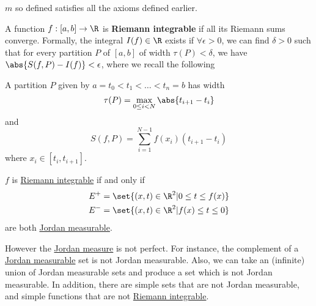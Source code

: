 \documentclass{article}
\newcommand{\1}[1]{\mathbbm{1}_{#1}}
\begin{document}

\begin{exercise}
    $m$ so defined satisfies all the axioms defined earlier.
\end{exercise}

\begin{defi}
    A function $f:[a, b] \to \R$ is \textbf{Riemann integrable} if all its Riemann sums converge.
    Formally, the integral $I(f) \in \R$ exists if $\forall \epsilon > 0$, we can find $\delta > 0$ such that for every partition $P$ of $[a, b]$ of width $\tau(P) < \delta$, we have $\abs{S(f, P) - I(f)} < \epsilon$, where we recall the following

    A partition $P$ given by $a = t_0 < t_1 < \dots < t_n = b$ has width
    \begin{equation*}
        \tau(P) = \max_{0 \leq i < N} \abs{t_{i+1} - t_i}
    \end{equation*}
    and
    \begin{equation*}
        S(f, P) = \sum_{i=1}^{N-1} f(x_i) (t_{i+1} - t_i)
    \end{equation*}
    where $x_i \in [t_i, t_{i+1}]$.
\end{defi}

\begin{prop}
    $f$ is \hyperlink{def:riemannIntegrable}{Riemann integrable} if and only if
    \begin{align*}
        E^+ &= \set{(x, t) \in \R^2 | 0 \leq t \leq f(x)} \\
        E^- &= \set{(x, t) \in \R^2 | f(x) \leq t \leq 0}
    \end{align*}
    are both \hyperlink{def:jMeasurable}{Jordan measurable}.
\end{prop}

However the \hyperlink{def:jMeasure}{Jordan measure} is not perfect. For instance, the complement of a \hyperlink{def:jMeasurable}{Jordan measurable} set is not Jordan measurable.
Also, we can take an (infinite) union of Jordan measurable sets and produce a set which is not Jordan measurable.
In addition, there are simple sets that are not Jordan measurable, and simple functions that are not \hyperlink{def:riemannIntegrable}{Riemann integrable}.
\end{document}
